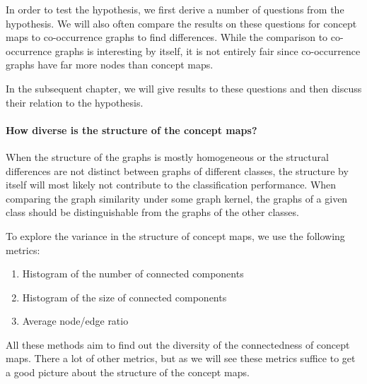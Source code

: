 
In order to test the hypothesis, we first derive a number of questions from the hypothesis.
We will also often compare the results on these questions for concept maps to co-occurrence graphs to find differences. While the comparison to co-occurrence graphs is interesting by itself, it is not entirely fair since co-occurrence graphs have far more nodes than concept maps.

In the subsequent chapter, we will give results to these questions and then discuss their relation to the hypothesis.

\paragraph{How diverse is the structure of the concept maps?}
When the structure of the graphs is mostly homogeneous or the structural differences are not distinct between graphs of different classes, the structure by itself will most likely not contribute to the classification performance.
When comparing the graph similarity under some graph kernel, the graphs of a given class should be distinguishable from the graphs of the other classes.

To explore the variance in the structure of concept maps, we use the following metrics:
\begin{enumerate}
    \item{Histogram of the number of connected components}
    \item{Histogram of the size of connected components}
    \item{Average node/edge ratio}
\end{enumerate}

All these methods aim to find out the diversity of the connectedness of concept maps. There a lot of other metrics, but as we will see these metrics suffice to get a good picture about the structure of the concept maps.

